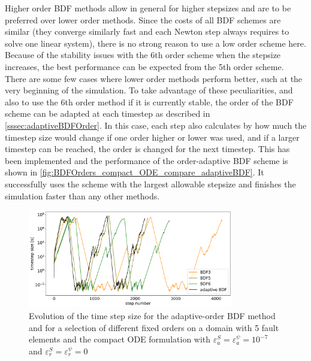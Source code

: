 Higher order BDF methods allow in general for higher stepsizes and are to be preferred over lower order methods. Since the costs of all BDF schemes are similar (they converge similarly fast and each Newton step always requires to solve one linear system), there is no strong reason to use a low order scheme here. Because of the stability issues with the 6th order scheme when the stepsize increases, the best performance can be expected from the 5th order scheme. There are some few cases where lower order methods perform better, such at the very beginning of the simulation. To take advantage of these peculiarities, and also to use the 6th order method if it is currently stable, the order of the BDF scheme can be adapted at each timestep as described in \autoref{sssec:adaptiveBDFOrder}. In this case, each step also calculates by how much the timestep size would change if one order higher or lower was used, and if a larger timestep can be reached, the order is changed for the next timestep. This has been implemented and the performance of the order-adaptive BDF scheme is shown in \autoref{fig:BDFOrders_compact_ODE_compare_adaptiveBDF}. It successfully uses the scheme with the largest allowable stepsize and finishes the simulation faster than any other methods. 


\begin{figure}[H]
	\centering
	\includegraphics[width=0.8\textwidth]{images/TANDEMTimeAnalysisDifferentBDFOrders_Lagrange_CompactODE_Size5_FULLTIME.png}
	\caption{Evolution of the time step size for the adaptive-order BDF method and for a selection of different fixed orders on a domain with 5 fault elements and the compact ODE formulation with $\varepsilon^S_a = \varepsilon^{\psi}_a = 10^{-7}$ and $\varepsilon^S_r = \varepsilon^{\psi}_r = 0$ }
	\label{fig:BDFOrders_compact_ODE_compare_adaptiveBDF}
\end{figure}


